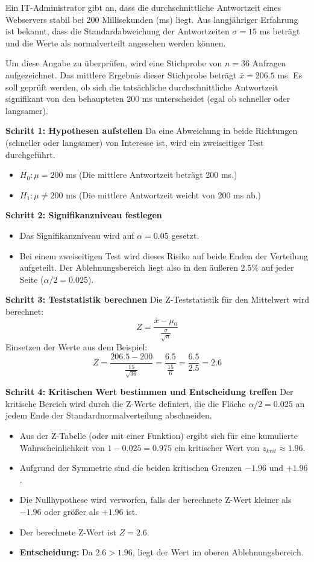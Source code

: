 Ein IT-Administrator gibt an, dass die durchschnittliche Antwortzeit eines Webservers stabil bei 200 Millisekunden (ms) liegt. Aus langjähriger Erfahrung ist bekannt, dass die Standardabweichung der Antwortzeiten $\sigma = 15$ ms beträgt und die Werte als normalverteilt angesehen werden können.

Um diese Angabe zu überprüfen, wird eine Stichprobe von $n=36$ Anfragen aufgezeichnet. Das mittlere Ergebnis dieser Stichprobe beträgt $\bar{x} = 206.5$ ms. Es soll geprüft werden, ob sich die tatsächliche durchschnittliche Antwortzeit signifikant von den behaupteten 200 ms unterscheidet (egal ob schneller oder langsamer).

\textbf{Schritt 1: Hypothesen aufstellen}
Da eine Abweichung in beide Richtungen (schneller oder langsamer) von Interesse ist, wird ein zweiseitiger Test durchgeführt.
\begin{itemize}
    \item $H_0: \mu = 200$ ms (Die mittlere Antwortzeit beträgt 200 ms.)
    \item $H_1: \mu \neq 200$ ms (Die mittlere Antwortzeit weicht von 200 ms ab.)
\end{itemize}

\textbf{Schritt 2: Signifikanzniveau festlegen}
\begin{itemize}
    \item Das Signifikanzniveau wird auf $\alpha = 0.05$ gesetzt.
    \item Bei einem zweiseitigen Test wird dieses Risiko auf beide Enden der Verteilung aufgeteilt. Der Ablehnungsbereich liegt also in den äußeren $2.5\%$ auf jeder Seite ($\alpha/2 = 0.025$).
\end{itemize}

\textbf{Schritt 3: Teststatistik berechnen}
Die Z-Teststatistik für den Mittelwert wird berechnet:
$$Z = \frac{\bar{x} - \mu_0}{\frac{\sigma}{\sqrt{n}}}$$Einsetzen der Werte aus dem Beispiel:$$Z = \frac{206.5 - 200}{\frac{15}{\sqrt{36}}} = \frac{6.5}{\frac{15}{6}} = \frac{6.5}{2.5} = 2.6$$

\textbf{Schritt 4: Kritischen Wert bestimmen und Entscheidung treffen}
Der kritische Bereich wird durch die Z-Werte definiert, die die Fläche $\alpha/2 = 0.025$ an jedem Ende der Standardnormalverteilung abschneiden.
\begin{itemize}
    \item Aus der Z-Tabelle (oder mit einer Funktion) ergibt sich für eine kumulierte Wahrscheinlichkeit von $1 - 0.025 = 0.975$ ein kritischer Wert von $z_{krit} \approx 1.96$.
    \item Aufgrund der Symmetrie sind die beiden kritischen Grenzen $-1.96$ und $+1.96$.
    \item Die Nullhypothese wird verworfen, falls der berechnete Z-Wert kleiner als $-1.96$ oder größer als $+1.96$ ist.
    \item Der berechnete Z-Wert ist $Z = 2.6$.
    \item \textbf{Entscheidung:} Da $2.6 > 1.96$, liegt der Wert im oberen Ablehnungsbereich.
\end{itemize}

